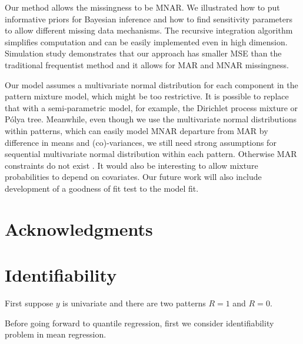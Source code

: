 \documentclass[12pt]{article}
\newcommand{\polya}{P\'{o}lya}
\begin{document}
Our method allows the missingness to be MNAR.  We illustrated how to
put informative priors for Bayesian inference and how to find
sensitivity parameters to allow different missing data mechanisms.
The recursive integration algorithm simplifies computation and can be
easily implemented even in high dimension.  Simulation study
demonstrates that our approach has smaller MSE than the traditional
frequentist method and it allows for MAR and MNAR missingness.

Our model assumes a multivariate normal distribution for each
component in the pattern mixture model, which might be too
restrictive. It is possible to replace that with a semi-parametric
model, for example, the Dirichlet process mixture or \polya{} tree.
Meanwhile, even though we use the multivariate normal distributions
within patterns, which can easily model MNAR departure from MAR by
difference in means and (co)-variances, we still need strong
assumptions for sequential multivariate normal distribution within
each pattern. Otherwise MAR constraints do not exist \citep{wang2011}.
It would also be interesting to allow mixture probabilities to depend
on covariates. Our future work will also include development of a
goodness of fit test to the model fit.

\section{Acknowledgments}




\appendix
\section{Identifiability}
\label{sec:iden}
First suppose $y$ is univariate and there are two patterns $R = 1$ and
$R = 0$.

Before going forward to quantile regression, first we consider
identifiability problem in mean regression.
\end{document}
